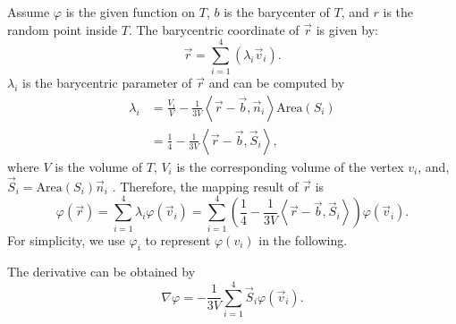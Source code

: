 \documentclass{article}
\begin{document}
Assume $\varphi$ is the given function on $T$, $b$ is the barycenter of $T$, and $r$ is the random point inside $T$. The barycentric coordinate of $\vec{r}$ is given by:
\begin{equation}
    \vec{r} = \sum^4_{i = 1}\left(\lambda_i \vec{v}_i \right).
\end{equation}
$\lambda_i$ is the barycentric parameter of $\vec{r}$ and can be computed by
\begin{equation}
\begin{aligned}
    \lambda_i & = \frac{V_i}{V} - \frac{1}{3V}\left<\vec{r}-\vec{b}, \vec{n}_i\right>\text{Area}\left(S_i \right)\\
    &=\frac{1}{4} - \frac{1}{3V}\left<\vec{r}-\vec{b}, \vec{S}_i\right>,
\end{aligned}
\end{equation}
where $V$ is the volume of $T$, $V_i$ is the corresponding volume of the vertex $v_i$, and, $\vec{S}_i = \text{Area}\left(S_i \right)\vec{n}_i$ . Therefore, the mapping result of $\vec{r}$ is 
\begin{equation}
    \varphi(\vec{r}) = \sum^{4}_{i = 1} \lambda_i \varphi(\vec{v}_i) = \sum^{4}_{i = 1}\left(\frac{1}{4} - \frac{1}{3V}\left<\vec{r}-\vec{b}, \vec{S}_i\right>\right)\varphi(\vec{v}_i).
\end{equation}
For simplicity, we use $\varphi_i$ to represent $\varphi(v_i)$ in the following.

The derivative can be obtained by
\begin{equation}
    \nabla \varphi = - \frac{1}{3V}\sum^{4}_{i = 1}\vec{S}_i \varphi(\vec{v}_i). 
\end{equation}
\end{document}
